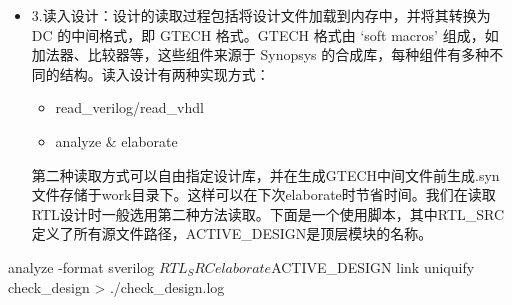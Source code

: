 \begin{itemize}
\begin{CodeBlock}[language=BookTcl]
set link_library [list "std_cells.db" "macros.db" "black_boxes.db"]
set target_library [list "std_cells.db"]
set symbol_library [list "sym.db"]
set synthetic_library [list "dw_foundation.sldb"]
\end{CodeBlock}
\item
  3.读入设计：设计的读取过程包括将设计文件加载到内存中，并将其转换为
  DC 的中间格式，即 GTECH 格式。GTECH 格式由 `soft macros'
  组成，如加法器、比较器等，这些组件来源于 Synopsys
  的合成库，每种组件有多种不同的结构。读入设计有两种实现方式：

  \begin{itemize}
  \tightlist
  \item
    read\_verilog/read\_vhdl
  \item
    analyze \& elaborate
  \end{itemize}

  第二种读取方式可以自由指定设计库，并在生成GTECH中间文件前生成.syn文件存储于work目录下。这样可以在下次elaborate时节省时间。我们在读取RTL设计时一般选用第二种方法读取。下面是一个使用脚本，其中RTL\_SRC定义了所有源文件路径，ACTIVE\_DESIGN是顶层模块的名称。
\end{itemize}

\begin{CodeBlock}[language=BookTcl]
analyze -format sverilog $RTL_SRC
elaborate $ACTIVE_DESIGN
link
uniquify
check_design > ./check_design.log
\end{CodeBlock}

